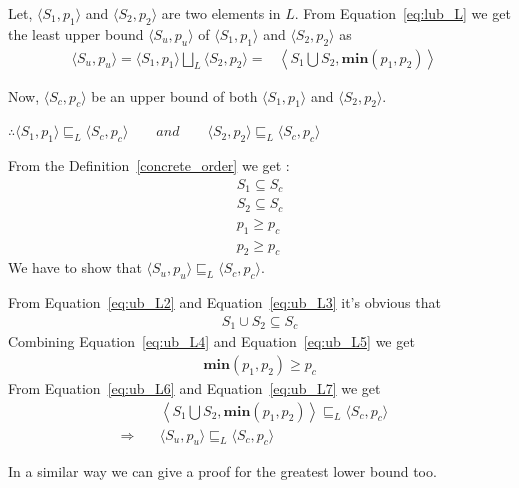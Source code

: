 \documentclass[final,3p, review, times]{Elsevier/elsarticle}
\begin{document}
Let, $\langle S_1,p_1\rangle$ and $\langle S_2,p_2\rangle$ are two elements in $L$. From Equation~\ref{eq:lub_L} we get the least upper bound $\langle S_u,p_u\rangle$ of $\langle S_1,p_1\rangle$ and $\langle S_2,p_2\rangle$ as
\begin{align}
\langle S_u,p_u\rangle=\langle S_1,p_1\rangle\bigsqcup_L\langle S_2,p_2\rangle=&\left\langle S_1\bigcup S_2,\textbf{min}(p_1,p_2)\right\rangle\label{eq:ub_L1}&
\end{align}

\noindent Now, $\langle S_c,p_c\rangle$ be an upper bound of both $\langle S_1,p_1\rangle$ and $\langle S_2,p_2\rangle$.

\noindent $\therefore \langle S_1,p_1\rangle\sqsubseteq_L\langle S_c,p_c\rangle\qquad and\qquad \langle S_2,p_2\rangle\sqsubseteq_L \langle S_c,p_c\rangle$

\noindent From the Definition~\ref{concrete_order} we get :
\begin{align}
&S_1\subseteq S_c&\label{eq:ub_L2}\\
&S_2\subseteq S_c&\label{eq:ub_L3}\\
&p_1\geq p_c&\label{eq:ub_L4}\\
&p_2\geq p_c&\label{eq:ub_L5}
\end{align}
We have to show that $\langle S_u,p_u\rangle\sqsubseteq_L \langle S_c,p_c\rangle$.

\noindent From Equation~\ref{eq:ub_L2} and Equation~\ref{eq:ub_L3} it's obvious that
\begin{align}
&S_1\cup S_2\subseteq S_c&\label{eq:ub_L6}
\end{align}
Combining Equation~\ref{eq:ub_L4} and Equation~\ref{eq:ub_L5} we get
\begin{align}
&\textbf{min}(p_1,p_2)\geq p_c&\label{eq:ub_L7}
\end{align}
From Equation~\ref{eq:ub_L6} and Equation~\ref{eq:ub_L7} we get
\begin{align}
&\left\langle S_1\bigcup S_2, \textbf{min}(p_1,p_2)\right\rangle\sqsubseteq_L\langle S_c,p_c\rangle&\nonumber\\
\Rightarrow\quad&\langle S_u,p_u\rangle\sqsubseteq_L\langle S_c,p_c\rangle\nonumber
\end{align}

\noindent In a similar way we can give a proof for the greatest lower bound too.








\newpage
\end{document}
